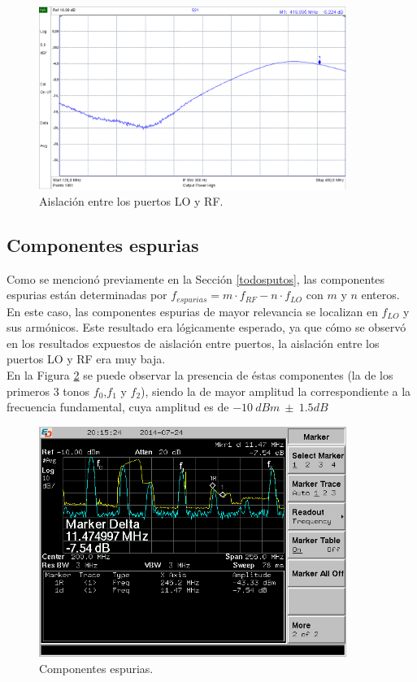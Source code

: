 \documentclass[a4paper,10pt]{article}
\begin{document}
	\begin{figure}[!htb]
		\centering
		\includegraphics[width=10cm]{Images/aislacion3.png}
		\caption{Aislaci\'on entre los puertos LO y RF.}
		\label{isolation3}
	\end{figure}	
	
	\subsection{Componentes espurias}
	\indent Como se mencion\'o previamente en la Secci\'on \ref{todosputos}, las
	componentes espurias est\'an determinadas por 
	$f_{espurias}=m\cdot f_{RF}-n\cdot f_{LO}$ con $m$ y $n$ enteros. En este 
	caso, las componentes espurias de mayor relevancia se localizan en $f_{LO}$ 
	y sus arm\'onicos. Este resultado era l\'ogicamente esperado, ya que c\'omo 
	se observ\'o en los resultados expuestos de aislaci\'on entre puertos, la 
	aislaci\'on entre los puertos LO y RF era muy baja. \\
	\indent En la Figura \ref{espurios} se puede observar la presencia de 
	\'estas componentes (la de los primeros 3 tonos $f_0$,$f_1$ y $f_2$), siendo
	la de mayor amplitud la correspondiente a la frecuencia fundamental, cuya 
	amplitud es de $-10~dBm~\pm~1.5dB$
	
	\begin{figure}[!htb]
		\centering
		\includegraphics[width=10cm]{Images/SCREN539.png}
		\caption{Componentes espurias.}
		\label{espurios}
	\end{figure}
		
\end{document}
